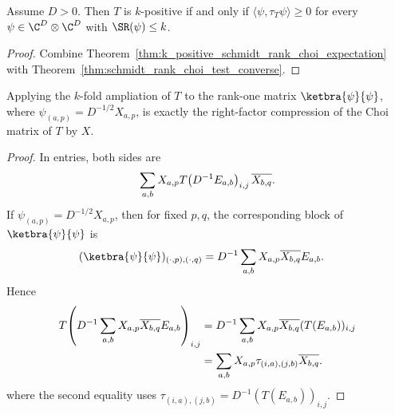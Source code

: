 \begin{theorem}
    \label{thm:schmidt_rank_choi_test_iff}
    \leanok
    Assume $D>0$. Then $T$ is $k$-positive if and only if
    $\langle\psi,\tau_T\psi\rangle\ge0$ for every
    $\psi\in\C^D\otimes\C^D$ with $\SR(\psi)\le k$.
\end{theorem}

\begin{proof}
    \leanok
    Combine Theorem~\ref{thm:k_positive_schmidt_rank_choi_expectation} with
    Theorem~\ref{thm:schmidt_rank_choi_test_converse}.
\end{proof}

\begin{lemma}
    \label{lem:rank_one_ampliation_choi_compression}
    \leanok
    Applying the $k$-fold ampliation of $T$ to the rank-one matrix
    $\ketbra{\psi}{\psi}$, where
    $\psi_{(a,p)}=D^{-1/2}X_{a,p}$, is exactly the right-factor compression
    of the Choi matrix of $T$ by $X$.
\end{lemma}

\begin{proof}
    \leanok
    In entries, both sides are
    \begin{align}
        \sum_{a,b}X_{a,p}
        T\!\left(D^{-1}E_{a,b}\right)_{i,j}
        \overline{X_{b,q}}.
        \notag
    \end{align}
    If $\psi_{(a,p)}=D^{-1/2}X_{a,p}$, then for fixed $p,q$, the corresponding
    block of $\ketbra{\psi}{\psi}$ is
    \begin{align}
        (\ketbra{\psi}{\psi})_{(\cdot,p),(\cdot,q)}
         & =D^{-1}\sum_{a,b}X_{a,p}\overline{X_{b,q}}E_{a,b}.
        \notag
    \end{align}
    Hence
    \begin{align}
        T\!\left(D^{-1}\sum_{a,b}
           X_{a,p}\overline{X_{b,q}}E_{a,b}\right)_{i,j}
         & =D^{-1}\sum_{a,b}X_{a,p}\overline{X_{b,q}}
                                   (T(E_{a,b}))_{i,j} \notag \\
         & =\sum_{a,b}X_{a,p}\tau_{(i,a),(j,b)}
        \overline{X_{b,q}}.
        \notag
    \end{align}
    where the second equality uses
    $\tau_{(i,a),(j,b)}=D^{-1}(T(E_{a,b}))_{i,j}$.
\end{proof}

